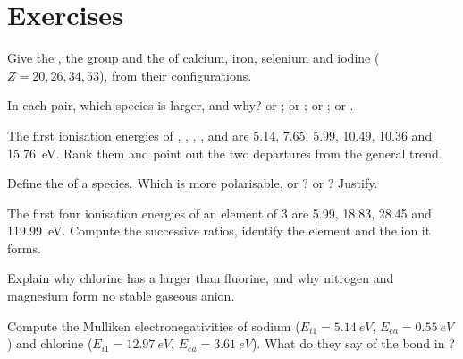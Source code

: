 \section{Exercises}

\begin{exercise}[$\star$]\label{exo:b1:periodicity:1}
Give the , the group and the  of calcium, iron, selenium and
iodine ($Z = 20, 26, 34, 53$), from their configurations.
\end{exercise}

\begin{exercise}[$\star$]\label{exo:b1:periodicity:2}
In each pair, which species is larger, and why?  or ;
 or ;  or ;  or .
\end{exercise}

\begin{exercise}[$\star$]\label{exo:b1:periodicity:3}
The first ionisation energies of , , , ,
 and  are 5.14, 7.65, 5.99, 10.49, 10.36 and
\qty{15.76}{eV}. Rank them and point out the two departures from the
general trend.
\end{exercise}

\begin{exercise}[$\star$]\label{exo:b1:periodicity:4}
Define the  of a species. Which is more polarisable, 
or ?  or ? Justify.
\end{exercise}

\begin{exercise}[$\star\star$]\label{exo:b1:periodicity:5}
The first four ionisation energies of an element of  3 are 5.99,
18.83, 28.45 and \qty{119.99}{eV}. Compute the successive ratios,
identify the element and the ion it forms.
\end{exercise}

\begin{exercise}[$\star\star$]\label{exo:b1:periodicity:6}
Explain why chlorine has a larger  than fluorine, and why
nitrogen and magnesium form no stable gaseous anion.
\end{exercise}

\begin{exercise}[$\star\star$]\label{exo:b1:periodicity:7}
Compute the Mulliken electronegativities of sodium ($E_{i1} =
\qty{5.14}{eV}$, $E_{ea} = \qty{0.55}{eV}$) and chlorine ($E_{i1} =
\qty{12.97}{eV}$, $E_{ea} = \qty{3.61}{eV}$). What do they say of the
bond in ?
\end{exercise}

